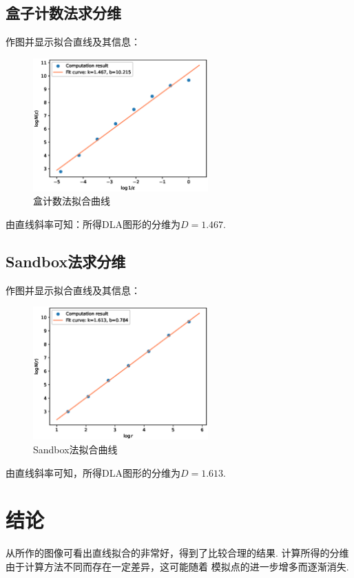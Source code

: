 \documentclass[12pt,a4paper,utf8]{ctexart}
\begin{document}
\subsection{盒子计数法求分维}

作图并显示拟合直线及其信息：
\begin{figure}[!h]
    \centering
    \includegraphics[width=0.6\textwidth]{box.eps}
    \caption{盒计数法拟合曲线}
\end{figure}

由直线斜率可知：所得DLA图形的分维为$D=1.467$.
\subsection{Sandbox法求分维}

作图并显示拟合直线及其信息：
\begin{figure}[!h]
    \centering
    \includegraphics[width=0.6\textwidth]{sand.eps}
    \caption{Sandbox法拟合曲线}
\end{figure}

由直线斜率可知，所得DLA图形的分维为$D=1.613$.

\section{结论}

从所作的图像可看出直线拟合的非常好，得到了比较合理的结果. 
计算所得的分维由于计算方法不同而存在一定差异，这可能随着
模拟点的进一步增多而逐渐消失. 
\end{document}
